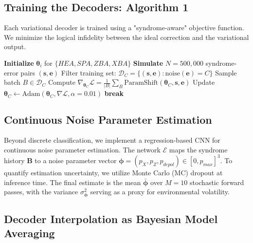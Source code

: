\documentclass[journal,twocolumn]{IEEEtran}
\begin{document}
\subsection{Training the Decoders: Algorithm 1}

Each variational decoder is trained using a "syndrome-aware" objective function. We minimize the logical infidelity between the ideal correction and the variational output.

\begin{algorithm}
\caption{Adaptive Decoder Training Loop}
\begin{algorithmic}[1]
\STATE \textbf{Initialize} $\boldsymbol{\theta}_i$ for $\{HEA, SPA, ZBA, XBA\}$
\STATE \textbf{Simulate} $N=500,000$ syndrome-error pairs $(\mathbf{s}, \mathbf{e})$
    \STATE Filter training set: $\mathcal{D}_C = \{(\mathbf{s}, \mathbf{e}) : \text{noise}(\mathbf{e}) = C\}$
        \STATE Sample batch $B \in \mathcal{D}_C$
        \STATE Compute $\nabla_{\boldsymbol{\theta}_C} \mathcal{L} = \frac{1}{|B|} \sum_{B} \text{ParamShift}(\boldsymbol{\theta}_C, \mathbf{s}, \mathbf{e})$
        \STATE Update $\boldsymbol{\theta}_C \leftarrow \text{Adam}(\boldsymbol{\theta}_C, \nabla \mathcal{L}, \alpha=0.01)$
            \STATE \textbf{break}
        \ENDIF
    \ENDFOR
\ENDFOR
\end{algorithmic}
\end{algorithm}

\subsection{Continuous Noise Parameter Estimation}

Beyond discrete classification, we implement a regression-based CNN for continuous noise parameter estimation. The network $\mathcal{E}$ maps the syndrome history $\mathbf{B}$ to a noise parameter vector $\boldsymbol{\phi} = (p_X, p_Z, p_{depol}) \in [0, p_{max}]^3$. To quantify estimation uncertainty, we utilize Monte Carlo (MC) dropout at inference time. The final estimate is the mean $\bar{\boldsymbol{\phi}}$ over $M=10$ stochastic forward passes, with the variance $\sigma^2_{\boldsymbol{\phi}}$ serving as a proxy for environmental volatility.

\subsection{Decoder Interpolation as Bayesian Model Averaging}
\end{document}

